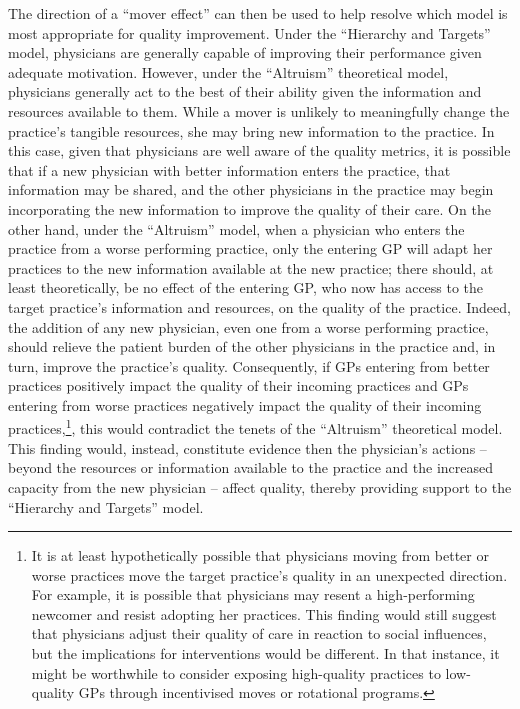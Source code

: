 \documentclass[12pt]{article}
\begin{document}
The direction of a ``mover effect'' can then be used to help resolve which model is most appropriate for quality improvement. Under the ``Hierarchy and Targets'' model, physicians are generally capable of improving their performance given adequate motivation. However, under the ``Altruism'' theoretical model, physicians generally act to the best of their ability given the information and resources available to them. While a mover is unlikely to meaningfully change the practice's tangible resources, she may bring new information to the practice. In this case, given that physicians are well aware of the quality metrics, it is possible that if a new physician with better information enters the practice, that information may be shared, and the other physicians in the practice may begin incorporating the new information to improve the quality of their care. On the other hand, under the ``Altruism'' model, when a physician who enters the practice from a worse performing practice, only the entering GP will adapt her practices to the new information available at the new practice; there should, at least theoretically, be no effect of the entering GP, who now has access to the target practice's information and resources, on the quality of the practice. Indeed, the addition of any new physician, even one from a worse performing practice, should relieve the patient burden of the other physicians in the practice and, in turn, improve the practice's quality. Consequently, if GPs entering from better practices positively impact the quality of their incoming practices and GPs entering from worse practices negatively impact the quality of their incoming practices,\footnote{It is at least hypothetically possible that physicians moving from better or worse practices move the target practice's quality in an unexpected direction. For example, it is possible that physicians may resent a high-performing newcomer and resist adopting her practices. This finding would still suggest that physicians adjust their quality of care in reaction to social influences, but the implications for interventions would be different. In that instance, it might be worthwhile to consider exposing high-quality practices to low-quality GPs through incentivised moves or rotational programs.}, this would contradict the tenets of the ``Altruism'' theoretical model. This finding would, instead, constitute evidence then the physician's actions -- beyond the resources or information available to the practice and the increased capacity from the new physician -- affect quality, thereby providing support to the ``Hierarchy and Targets'' model.
\end{document}
